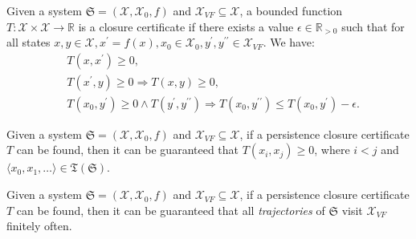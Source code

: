 \begin{definition}
\label{pcc-def}
Given a system $\mathfrak{S}=(\mathcal{X}, \mathcal{X}_0, f)$ and $\mathcal{X}_{VF} \subseteq \mathcal{X}$, a bounded function $T:\mathcal{X} \times \mathcal{X} \rightarrow \mathbb{R}$ is a closure certificate if there exists a value $\epsilon \in \mathbb{R}_{>0}$ such that for all states $x, y \in \mathcal{X}, x^{\prime} = f(x), x_0 \in \mathcal{X}_0, y^{\prime}, y^{\prime\prime} \in \mathcal{X}_{VF}$. We have:
\begin{align}
  &T(x, x^{\prime}) \geq 0, \label{cc1}\\
  &T(x^{\prime}, y) \geq 0 \Rightarrow T(x, y) \geq 0, \label{cc2} \\
  &T(x_0, y^{\prime}) \geq 0 \land T(y^{\prime}, y^{\prime\prime}) \Rightarrow T(x_0, y^{\prime\prime}) \leq T(x_0, y^{\prime}) - \epsilon. \label{cc3}
\end{align}
\end{definition}

\begin{lemma}
\label{cc-lemma}
Given a system $\mathfrak{S}=(\mathcal{X}, \mathcal{X}_0, f)$ and $\mathcal{X}_{VF} \subseteq \mathcal{X}$, if a persistence closure certificate $T$ can be found, then it can be guaranteed that $T(x_i, x_j) \geq 0$, where $i < j$ and $\langle x_0, x_1, \dots \rangle \in \mathfrak{T}(\mathfrak{S})$.
\end{lemma}

\begin{theorem}[persistence]
  Given a system $\mathfrak{S}=(\mathcal{X}, \mathcal{X}_0, f)$ and $\mathcal{X}_{VF} \subseteq \mathcal{X}$, if a persistence closure certificate $T$ can be found, then it can be guaranteed that all \emph{trajectories} of $\mathfrak{S}$ visit \(\mathcal{X}_{VF}\) finitely often.
\end{theorem}

